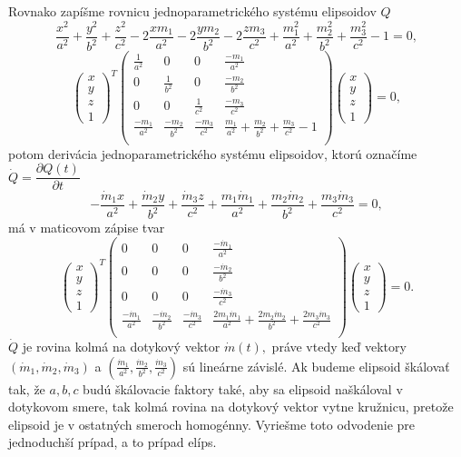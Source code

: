 Rovnako zapíšme rovnicu jednoparametrického systému elipsoidov $Q$
$$ \frac{x^2}{a^2} + \frac{y^2}{b^2} + \frac{z^2}{c^2} - 2 \frac{xm_1}{a^2} - 2 \frac{ym_2}{b^2} - 2 \frac{zm_3}{c^2} + \frac{m_1^2}{a^2} + \frac{m_2^2}{b^2} + \frac{m_3^2}{c^2} - 1 = 0,$$
$$
\left(\begin{matrix} x \\ y \\ z  \\ 1
\end{matrix} \right)^T \left(\begin{matrix} 
\frac{1}{a^2} & 0 & 0 & \frac{-m_1}{a^2} \\
0 & \frac{1}{b^2} & 0 & \frac{-m_2}{b^2} \\
0 & 0 & \frac{1}{c^2} & \frac{-m_3}{c^2} \\
\frac{-m_1}{a^2} & \frac{-m_2}{b^2} & \frac{-m_3}{c^2} & \frac{m_1}{a^2} + \frac{m_2}{b^2} + \frac{m_3}{c^2} - 1 \\
\end{matrix} \right)\left(\begin{matrix} x \\ y \\ z \\ 1
\end{matrix} \right) = 0,
$$
potom derivácia jednoparametrického systému elipsoidov, ktorú označíme $\dot{Q} = \dfrac{\partial Q(t)}{\partial t}$
$$
-\frac{\dot{m}_1x}{a^2} + \frac{\dot{m}_2y}{b^2} + \frac{\dot{m}_3z}{c^2} + \frac{m_1\dot{m}_1}{a^2} + \frac{m_2 \dot{m}_2}{b^2} + \frac{m_3 \dot{m}_3}{c^2} = 0,
$$
má v maticovom zápise tvar
$$
\left(\begin{matrix} x \\ y \\ z  \\ 1
\end{matrix} \right)^T \left(\begin{matrix} 
0 & 0 & 0 & \frac{-\dot{m}_1}{a^2} \\
0 & 0 & 0 & \frac{-\dot{m}_2}{b^2} \\
0 & 0 & 0 & \frac{-\dot{m}_3}{c^2} \\
\frac{-\dot{m}_1}{a^2} & \frac{-\dot{m}_2}{b^2} & \frac{-\dot{m}_3}{c^2} & \frac{2m_1\dot{m}_1}{a^2} + \frac{2m_2 \dot{m}_2}{b^2} + \frac{2m_3 \dot{m}_3}{c^2}\\
\end{matrix} \right)\left(\begin{matrix} x \\ y \\ z \\ 1
\end{matrix} \right) = 0.
$$
$ \dot{Q}$ je rovina kolmá na dotykový vektor $\dot{m}(t), $ práve vtedy keď vektory $(\dot{m}_1, \dot{m}_2, \dot{m}_3) $ a $(\frac{\dot{m}_1}{a^2}, \frac{\dot{m}_2}{b^2}, \frac{\dot{m}_3}{c^2}) $ sú lineárne závislé. Ak budeme elipsoid škálovať tak, že $a, b, c$ budú škálovacie faktory také, aby sa elipsoid naškáloval v dotykovom smere, tak kolmá rovina na dotykový vektor vytne kružnicu, pretože elipsoid je v ostatných smeroch homogénny. Vyriešme toto odvodenie pre jednoduchší prípad, a to prípad elíps.


